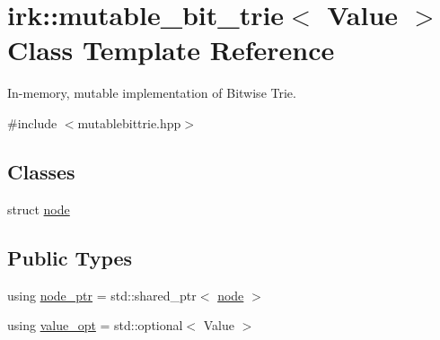 \hypertarget{classirk_1_1mutable__bit__trie}{}\section{irk\+:\+:mutable\+\_\+bit\+\_\+trie$<$ Value $>$ Class Template Reference}
\label{classirk_1_1mutable__bit__trie}


In-\/memory, mutable implementation of Bitwise Trie.  




{\ttfamily \#include $<$mutablebittrie.\+hpp$>$}

\subsection*{Classes}
\begin{DoxyCompactItemize}
\item 
struct \mbox{\hyperlink{structirk_1_1mutable__bit__trie_1_1node}{node}}
\end{DoxyCompactItemize}
\subsection*{Public Types}
\begin{DoxyCompactItemize}
\item 
using \mbox{\hyperlink{classirk_1_1mutable__bit__trie_abd23179ac4f02a981d4f47b4c0652287}{node\+\_\+ptr}} = std\+::shared\+\_\+ptr$<$ \mbox{\hyperlink{structirk_1_1mutable__bit__trie_1_1node}{node}} $>$
\item 
using \mbox{\hyperlink{classirk_1_1mutable__bit__trie_a9a5ed79af3e7e28054b00c2284b35612}{value\+\_\+opt}} = std\+::optional$<$ Value $>$
\end{DoxyCompactItemize}
